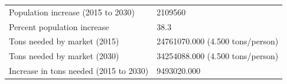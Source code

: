 \begin{tabular}{l|l}
\hline\hline
\newline
 Population increase (2015 to 2030) & 2109560 \\ 
 Percent population increase & 38.3 \\ 
 Tons needed by market (2015) & 24761070.000  (4.500 tons/person) \\ 
 Tons needed by market (2030) & 34254088.000  (4.500 tons/person) \\ 
 Increase in tons needed (2015 to 2030) & 9493020.000 \\ 
\end{tabular}
